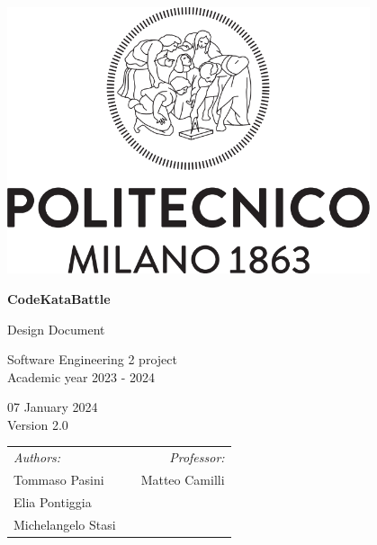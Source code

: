 
\begin{titlepage}
    \begin{center}
        \includegraphics[width=0.8\textwidth]{images/PoliMi_Logo.png}

        \vspace*{2cm}
        \textbf{\huge CodeKataBattle}

        \vspace{0.5cm}
        \LARGE Design Document

        \vspace{1.5cm}
        \normalsize Software Engineering 2 project\\
        Academic year 2023 - 2024

        \vspace{0.5cm}
        07 January 2024\\
        Version 2.0

        \vspace{1cm}
        \small
        \begin{table}[b]
            \centering
            \begin{tabular}{l p{5.5cm} l}
                \textit{Authors:}   &  & \multicolumn{1}{r}{\textit{Professor:}} \\
                Tommaso Pasini      &  & \multicolumn{1}{r}{Matteo Camilli}      \\
                Elia Pontiggia      &  & \textbf{}                               \\
                Michelangelo Stasi  &  & \textbf{}
            \end{tabular}
        \end{table}

    \end{center}
\end{titlepage}